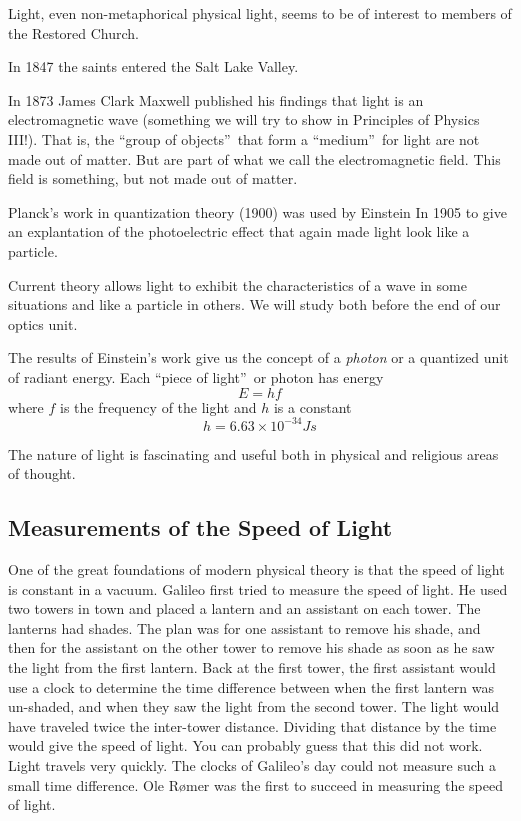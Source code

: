 \documentclass{article}
\begin{document}
Light, even non-metaphorical physical light, seems to be of interest to
members of the Restored Church.

In 1847 the saints entered the Salt Lake Valley.

In 1873 James Clark Maxwell published his findings that light is an
electromagnetic wave (something we will try to show in Principles of Physics
III!). That is, the \textquotedblleft group of objects\textquotedblright\
that form a \textquotedblleft medium\textquotedblright\ for light are not
made out of matter. But are part of what we call the electromagnetic field.
This field is something, but not made out of matter.

Planck's work in quantization theory (1900) was used by Einstein In 1905 to
give an explantation of the photoelectric effect that again made light look
like a particle.

Current theory allows light to exhibit the characteristics of a wave in some
situations and like a particle in others. We will study both before the end
of our optics unit.

The results of Einstein's work give us the concept of a \emph{photon} or a
quantized unit of radiant energy. Each \textquotedblleft piece of
light\textquotedblright\ or photon has energy 
\begin{equation}
E=hf
\end{equation}%
where $f$ is the frequency of the light and $h$ is a constant 
\begin{equation}
h=6.63\times 10^{-34}\unit{J}\unit{s}
\end{equation}

The nature of light is fascinating and useful both in physical and religious
areas of thought.

\subsection{Measurements of the Speed of Light}

One of the great foundations of modern physical theory is that the speed of
light is constant in a vacuum. Galileo first tried to measure the speed of
light. He used two towers in town and placed a lantern and an assistant on
each tower. The lanterns had shades. The plan was for one assistant to
remove his shade, and then for the assistant on the other tower to remove
his shade as soon as he saw the light from the first lantern. Back at the
first tower, the first assistant would use a clock to determine the time
difference between when the first lantern was un-shaded, and when they saw
the light from the second tower. The light would have traveled twice the
inter-tower distance. Dividing that distance by the time would give the
speed of light. You can probably guess that this did not work. Light travels
very quickly. The clocks of Galileo's day could not measure such a small
time difference. Ole R\o mer was the first to succeed in measuring the speed
of light.
\end{document}
